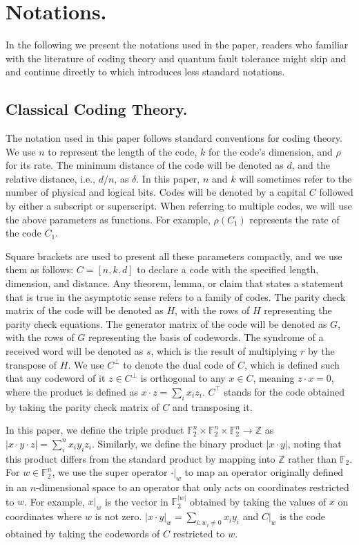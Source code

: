 \documentclass[manuscript,screen,review]{acmart}
\begin{document}
{  \section{ Notations. } In the following we present the notations used in the paper, readers who familiar with the literature of coding theory and quantum fault tolerance might skip  and  and continue directly to  which introduces less standard notations. 


  \subsection{Classical Coding Theory.} \label{sec:classical} The notation used in this paper follows standard conventions for coding theory. We use $n$ to represent the length of the code, $k$ for the code's dimension, and $\rho$ for its rate. The minimum distance of the code will be denoted as $d$, and the relative distance, i.e., $d/n$, as $\delta$. In this paper, $n$ and $k$ will sometimes refer to the number of physical and logical bits. Codes will be denoted by a capital $C$ followed by either a subscript or superscript. When referring to multiple codes, we will use the above parameters as functions. For example, $\rho(C_{1})$ represents the rate of the code $C_{1}$.

Square brackets are used to present all these parameters compactly, and we use them as follows: $C=[n,k,d]$ to declare a code with the specified length, dimension, and distance. Any theorem, lemma, or claim that states a statement that is true in the asymptotic sense refers to a family of codes. The parity check matrix of the code will be denoted as $H$, with the rows of $H$ representing the parity check equations. The generator matrix of the code will be denoted as $G$, with the rows of $G$ representing the basis of codewords. The syndrome of a received word will be denoted as $s$, which is the result of multiplying $r$ by the transpose of $H$. We use $C^\perp$ to denote the dual code of $C$, which is defined such that any codeword of it $z\in C^\perp$ is orthogonal to any $x\in C$, meaning $z\cdot x = 0$, where the product is defined as $x\cdot z = \sum_{i}{x_{i}z_{i}}$. $C^{\top}$ stands for the code obtained by taking the parity check matrix of $C$ and transposing it.

In this paper, we define the triple product $\mathbb{F}_2^{n}\times \mathbb{F}_2^{n}\times\mathbb{F}_2^{n} \rightarrow \mathbb{Z}$ as $|x\cdot y \cdot z| = \sum_{i}^{n}{x_{i}y_{i}z_{i}}$. Similarly, we define the binary product $|x \cdot y|$, noting that this product differs from the standard product by mapping into $\mathbb{Z}$ rather than $\mathbb{F}_{2}$. For $w \in \mathbb{F}_{2}^{n}$, we use the super operator $ \cdot |_{w} $ to map an operator originally defined in an $n$-dimensional space to an operator that only acts on coordinates restricted to $w$. For example, $x|_{w}$ is the vector in $\mathbb{F}_{2}^{|w|}$ obtained by taking the values of $x$ on coordinates where $w$ is not zero. $|x\cdot y|_{w} = \sum_{i:w_{i}\neq 0}{x_{i}y_{i}}$ and $C|_{w}$ is the code obtained by taking the codewords of $C$ restricted to $w$.

}
\end{document}
